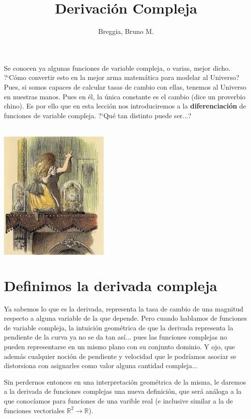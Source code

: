 \documentclass[12pt]{article}
\theoremstyle{definition}
\theoremstyle{theorem}
\theoremstyle{corolary}
\begin{document}
	\title{Derivaci\'on Compleja}
	\author{Breggia, Bruno M.}
	\date{}
	\maketitle

Se conocen ya algunas funciones de variable compleja, o varias, mejor dicho. ?`C\'omo convertir esto en la mejor arma matem\'atica para modelar al Universo? Pues, si somos capaces de calcular tasas de cambio con ellas, tenemos al Universo en nuestras manos. Pues en \'el, la \'unica constante es el cambio (dice un proverbio chino). Es por ello que en esta lecci\'on nos introduciremos a la \textbf{diferenciaci\'on} de funciones de variable compleja. ?`Qu\'e tan distinto puede ser...?\\ \\

\begin{center}
	\includegraphics[scale=1.4]{glass2.jpg}
\end{center}

\pagebreak
\tableofcontents
\pagebreak

\section{Definimos la derivada compleja}
Ya sabemos lo que es la derivada, representa la tasa de cambio de una magnitud respecto a alguna variable de la que depende. Pero cuando hablamos de funciones de variable compleja, la intuici\'on geom\'etrica de que la derivada representa la pendiente de la curva ya no se da tan as\'i... pues las funciones complejas no pueden representarse en un mismo plano con su conjunto dominio. Y ojo, que adem\'as cualquier noci\'on de pendiente y velocidad que le podr\'iamos asociar se distorsiona con asignarles como valor alguna cantidad compleja...

Sin perdernos entonces en una interpretaci\'on geom\'etrica de la misma, le daremos a la derivada de funciones complejas una nueva definici\'on, que ser\'a an\'aloga a la que conoc\'iamos para funciones de una varible real (e inclusive similar a la de funciones vectoriales $\mathbb{R}^2 \rightarrow \mathbb{R}$).\\
\end{document}
